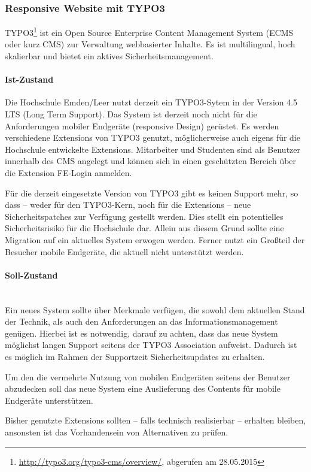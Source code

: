 \subsubsection{Responsive Website mit TYPO3}
TYPO3\footnote{\url{http://typo3.org/typo3-cms/overview/}, abgerufen am 28.05.2015} ist ein Open Source Enterprise Content Management System (ECMS oder kurz CMS) zur Verwaltung webbasierter Inhalte. Es ist multilingual, hoch skalierbar und bietet ein aktives Sicherheitsmanagement.

\paragraph{Ist-Zustand}
Die Hochschule Emden/Leer nutzt derzeit ein TYPO3-Sytem in der Version 4.5 LTS (Long Term Support). Das System ist derzeit noch nicht für die Anforderungen mobiler Endgeräte (responsive Design) gerüstet. Es werden verschiedene Extensions von TYPO3 genutzt, möglicherweise auch eigens für die Hochschule entwickelte Extensions. Mitarbeiter und Studenten sind als Benutzer innerhalb des CMS angelegt und können sich in einen geschützten Bereich über die Extension FE-Login anmelden.

Für die derzeit eingesetzte Version von TYPO3 gibt es keinen Support mehr, so dass – weder für den TYPO3-Kern, noch für die Extensions – neue Sicherheitspatches zur Verfügung gestellt werden. Dies stellt ein potentielles Sicherheitsrisiko für die Hochschule dar. Allein aus diesem Grund sollte eine Migration auf ein aktuelles System erwogen werden. Ferner nutzt ein Großteil der Besucher mobile Endgeräte, die aktuell nicht unterstützt werden.

\paragraph{Soll-Zustand}\mbox{}\\
Ein neues System sollte über Merkmale verfügen, die sowohl dem aktuellen Stand der Technik, als auch den Anforderungen an das Informationsmanagement genügen. Hierbei ist es notwendig, darauf zu achten, dass das neue System möglichst langen Support seitens der TYPO3 Association aufweist. Dadurch ist es möglich im Rahmen der Supportzeit Sicherheitsupdates zu erhalten. 

Um den die vermehrte Nutzung von mobilen Endgeräten seitens der Benutzer abzudecken soll das neue System eine Auslieferung des Contents für mobile Endgeräte unterstützen. 

Bisher genutzte Extensions sollten – falls technisch realisierbar – erhalten bleiben, ansonsten ist das Vorhandensein von Alternativen zu prüfen. 

